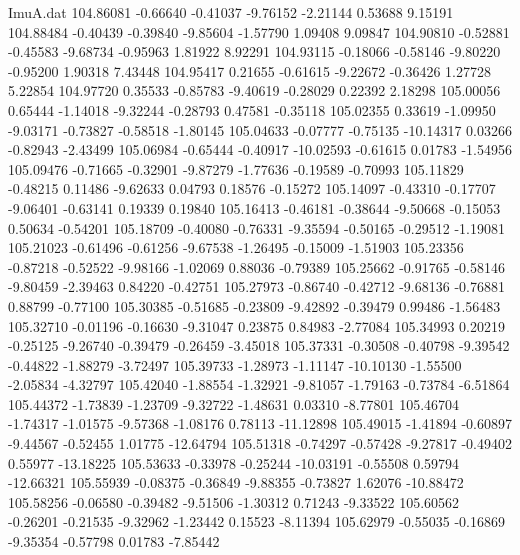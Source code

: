 \begin{filecontents}{ImuA.dat}
 104.86081   -0.66640   -0.41037   -9.76152   -2.21144    0.53688    9.15191
 104.88484   -0.40439   -0.39840   -9.85604   -1.57790    1.09408    9.09847
 104.90810   -0.52881   -0.45583   -9.68734   -0.95963    1.81922    8.92291
 104.93115   -0.18066   -0.58146   -9.80220   -0.95200    1.90318    7.43448
 104.95417    0.21655   -0.61615   -9.22672   -0.36426    1.27728    5.22854
 104.97720    0.35533   -0.85783   -9.40619   -0.28029    0.22392    2.18298
 105.00056    0.65444   -1.14018   -9.32244   -0.28793    0.47581   -0.35118
 105.02355    0.33619   -1.09950   -9.03171   -0.73827   -0.58518   -1.80145
 105.04633   -0.07777   -0.75135  -10.14317    0.03266   -0.82943   -2.43499
 105.06984   -0.65444   -0.40917  -10.02593   -0.61615    0.01783   -1.54956
 105.09476   -0.71665   -0.32901   -9.87279   -1.77636   -0.19589   -0.70993
 105.11829   -0.48215    0.11486   -9.62633    0.04793    0.18576   -0.15272
 105.14097   -0.43310   -0.17707   -9.06401   -0.63141    0.19339    0.19840
 105.16413   -0.46181   -0.38644   -9.50668   -0.15053    0.50634   -0.54201
 105.18709   -0.40080   -0.76331   -9.35594   -0.50165   -0.29512   -1.19081
 105.21023   -0.61496   -0.61256   -9.67538   -1.26495   -0.15009   -1.51903
 105.23356   -0.87218   -0.52522   -9.98166   -1.02069    0.88036   -0.79389
 105.25662   -0.91765   -0.58146   -9.80459   -2.39463    0.84220   -0.42751
 105.27973   -0.86740   -0.42712   -9.68136   -0.76881    0.88799   -0.77100
 105.30385   -0.51685   -0.23809   -9.42892   -0.39479    0.99486   -1.56483
 105.32710   -0.01196   -0.16630   -9.31047    0.23875    0.84983   -2.77084
 105.34993    0.20219   -0.25125   -9.26740   -0.39479   -0.26459   -3.45018
 105.37331   -0.30508   -0.40798   -9.39542   -0.44822   -1.88279   -3.72497
 105.39733   -1.28973   -1.11147  -10.10130   -1.55500   -2.05834   -4.32797
 105.42040   -1.88554   -1.32921   -9.81057   -1.79163   -0.73784   -6.51864
 105.44372   -1.73839   -1.23709   -9.32722   -1.48631    0.03310   -8.77801
 105.46704   -1.74317   -1.01575   -9.57368   -1.08176    0.78113  -11.12898
 105.49015   -1.41894   -0.60897   -9.44567   -0.52455    1.01775  -12.64794
 105.51318   -0.74297   -0.57428   -9.27817   -0.49402    0.55977  -13.18225
 105.53633   -0.33978   -0.25244  -10.03191   -0.55508    0.59794  -12.66321
 105.55939   -0.08375   -0.36849   -9.88355   -0.73827    1.62076  -10.88472
 105.58256   -0.06580   -0.39482   -9.51506   -1.30312    0.71243   -9.33522
 105.60562   -0.26201   -0.21535   -9.32962   -1.23442    0.15523   -8.11394
 105.62979   -0.55035   -0.16869   -9.35354   -0.57798    0.01783   -7.85442

\end{filecontents}
